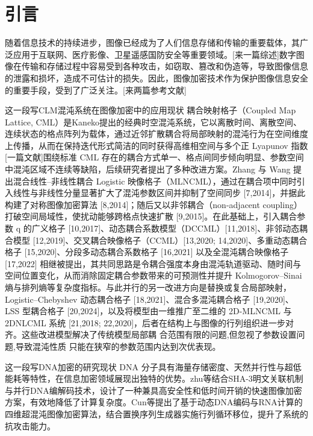 \section{引言}
\label{sec:intro}

随着信息技术的持续进步，图像已经成为了人们信息存储和传输的重要载体，其广泛应用于互联网、医疗影像、卫星遥感国防安全等重要领域。[来一篇综述]数字图像在传输和存储过程中容易受到各种攻击，如窃取、篡改和伪造等，导致图像信息的泄露和损坏，造成不可估计的损失。因此，图像加密技术作为保护图像信息安全的重要手段，受到了广泛关注。[来两篇参考文献]

这一段写CLM混沌系统在图像加密中的应用现状
耦合映射格子（Coupled Map Lattice, CML）是Kaneko提出的经典时空混沌系统\cite{Kaneko1989Spatiotemporal}，它以离散时间、离散空间、连续状态的格点阵列为载体，通过近邻扩散耦合将局部映射的混沌行为在空间维度上传播，从而在保持迭代形式简洁的同时获得高维相空间与多个正 Lyapunov 指数 [一篇文献]围绕标准 CML 存在的耦合方式单一、格点间同步倾向明显、参数空间中混沌区域不连续等缺陷，后续研究者提出了多种改进方案。Zhang 与 Wang 提出混合线性–非线性耦合 Logistic 映像格子（MLNCML），通过在耦合项中同时引入线性与非线性分量显著扩大了混沌参数区间并抑制了空间同步 [7,2014]，并据此构建了对称图像加密算法 [8,2014]；随后又以非邻耦合（non-adjacent coupling）打破空间局域性，使扰动能够跨格点快速扩散 [9,2015]。在此基础上，引入耦合参数 q 的广义格子 [10,2017]、动态耦合系数模型（DCCML）[11,2018]、非邻动态耦合模型 [12,2019]、交叉耦合映像格子（CCML）[13,2020; 14,2020]、多重动态耦合格子 [15,2020]、分段多动态耦合系数格子 [16,2021] 以及全混沌耦合映像格子 [17,2022] 相继被提出，其共同思路是令耦合强度本身由混沌轨道驱动、随时间与空间位置变化，从而消除固定耦合参数带来的可预测性并提升 Kolmogorov–Sinai 熵与排列熵等复杂度指标。与此并行的另一改进方向是替换或复合局部映射，Logistic–Chebyshev 动态耦合格子 [18,2021]、混合多混沌耦合格子 [19,2020]、LSS 型耦合格子 [20,2024]，以及将模型由一维推广至二维的 2D-MLNCML 与 2DNLCML 系统 [21,2018; 22,2020]，后者在结构上与图像的行列组织进一步对齐。这些改进模型解决了传统模型局部耦 合范围有限的问题,但忽视了参数设置问题,导致混沌性质 只能在狭窄的参数范围内达到次优表现。

这一段写DNA加密的研究现状
DNA 分子具有海量存储密度、天然并行性与超低能耗等特性，在信息加密领域展现出独特的优势\cite{Yan2023ColorDNA,Afify2023DynamicDNA,Yu2024DNANetwork,Aldayel2025LLEVerified,Huang2025DNAEncoding}。zhu等\cite{zhu2023parallelDNA}结合SHA-3明文关联机制与并行DNA编解码技术，设计了一种兼具高安全性和低时间开销的快速图像加密方案，有效地降低了计算复杂度。Cun\cite{Cun2023DNARNA}等提出了基于动态DNA编码与RNA计算的四维超混沌图像加密算法，结合置换序列生成器实施行列循环移位，提升了系统的抗攻击能力。

